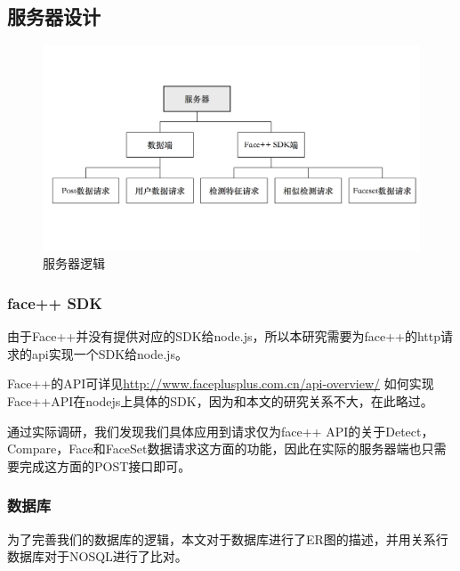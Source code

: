 \subsection{服务器设计}
\begin{figure}[h]
\centering
\includegraphics[width=\textwidth]{img/chap3/server.png}
\caption{服务器逻辑\label{Face++API}}
\end{figure}



\subsubsection{face++ SDK}
由于Face++并没有提供对应的SDK给node.js，所以本研究需要为face++的http请求的api实现一个SDK给node.js。

Face++的API可详见\url{http://www.faceplusplus.com.cn/api-overview/}
如何实现Face++API在nodejs上具体的SDK，因为和本文的研究关系不大，在此略过。

通过实际调研，我们发现我们具体应用到请求仅为face++ API的关于Detect，Compare，Face和FaceSet数据请求这方面的功能，因此在实际的服务器端也只需要完成这方面的POST接口即可。


\subsubsection{数据库}
为了完善我们的数据库的逻辑，本文对于数据库进行了ER图的描述，并用关系行数据库对于NOSQL进行了比对。

